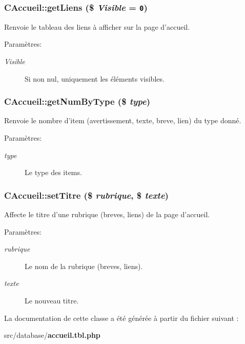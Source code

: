 \subsubsection{\setlength{\rightskip}{0pt plus 5cm}CAccueil::getLiens (\$ {\em Visible} = {\tt 0})}\label{class_c_accueil_04fdea106cc940842bb4f6b3ce4af528}


Renvoie le tableau des liens à afficher sur la page d'accueil. 

\begin{Desc}
\item[Paramètres:]
\begin{description}
\item[{\em Visible}]Si non nul, uniquement les éléments visibles. \end{description}
\end{Desc}
\subsubsection{\setlength{\rightskip}{0pt plus 5cm}CAccueil::getNumByType (\$ {\em type})}\label{class_c_accueil_145cb1b88eba4c551f07382dcabee84e}


Renvoie le nombre d'item (avertissement, texte, breve, lien) du type donné. 

\begin{Desc}
\item[Paramètres:]
\begin{description}
\item[{\em type}]Le type des items. \end{description}
\end{Desc}
\subsubsection{\setlength{\rightskip}{0pt plus 5cm}CAccueil::setTitre (\$ {\em rubrique}, \/  \$ {\em texte})}\label{class_c_accueil_87aa45bf7e64fd5984dfd4cadaf157c6}


Affecte le titre d'une rubrique (breves, liens) de la page d'accueil. 

\begin{Desc}
\item[Paramètres:]
\begin{description}
\item[{\em rubrique}]Le nom de la rubrique (breves, liens). \item[{\em texte}]Le nouveau titre. \end{description}
\end{Desc}


La documentation de cette classe a été générée à partir du fichier suivant :\begin{CompactItemize}
\item 
src/database/{\bf accueil.tbl.php}\end{CompactItemize}
